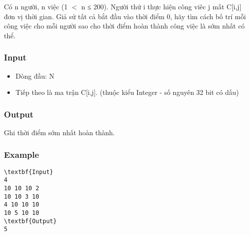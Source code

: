 

Có n người, n việc (1 $<$ n ≤ 200). Người thứ i thực hiện công viêc j mất C[i,j] đơn vị thời gian. Giả sử tất cả bắt đầu vào thời điểm 0, hãy tìm cách bố trí mỗi công việc cho mỗi người sao cho thời điểm hoàn thành công việc là sớm nhất có thể.

\subsubsection{Input}
\begin{itemize}
	\item Dòng đầu: N
	\item Tiếp theo là ma trận C[i,j]. (thuộc kiểu Integer - số nguyên 32 bit có dấu)
\end{itemize}

\subsubsection{Output}

Ghi thời điểm sớm nhất hoàn thành.

\subsubsection{Example}
\begin{verbatim}
\textbf{Input}
4
10 10 10 2
10 10 3 10
4 10 10 10
10 5 10 10
\textbf{Output}
5
\end{verbatim}